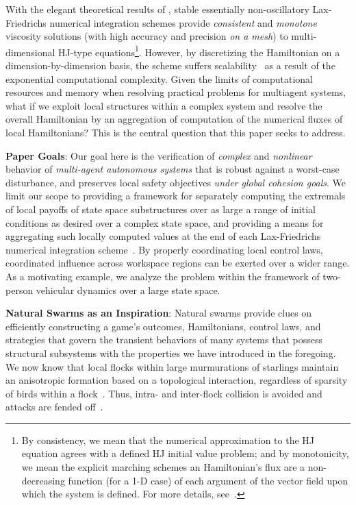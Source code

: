 With the elegant theoretical results of \cite{CrandallLaxFriedrichs, Crandall1984Approx, Evans1984, OsherShuENO, Crandall1984}, stable essentially non-oscillatory  Lax-Friedrichs numerical integration schemes provide  \textit{consistent} and \textit{monotone} viscosity solutions (with high accuracy and precision \textit{on a mesh}) to multi-dimensional HJ-type equations\footnote{By consistency, we mean that the numerical approximation to the HJ equation agrees with a defined HJ initial value problem; and by monotonicity, we mean the explicit marching schemes an Hamiltonian's flux are a non-decreasing function (for a 1-D case) of each argument of the vector field upon which the system is defined. For more details, see~\cite{Crandall1984Approx, OsherShuENO}.}. However, by discretizing the Hamiltonian on a dimension-by-dimension basis, the scheme suffers scalability~\cite{SylviaScalability, Bajcsy, Bansal} as a result of the exponential computational complexity. Given the limits of computational resources and memory when resolving practical problems for multiagent systems, what if we exploit local structures within a complex system and resolve the overall Hamiltonian by an aggregation of  computation of the numerical fluxes of local Hamiltonians? This is the central question that this paper seeks to address.


\textbf{Paper Goals}: Our goal here is the verification of  \textit{complex} and \textit{nonlinear} behavior of  \textit{multi-agent autonomous systems} that is robust against a worst-case disturbance, and preserves local safety objectives \textit{under global cohesion goals}. We limit our scope to providing a framework for separately computing the extremals of local payoffs of state space substructures over as large a range of initial conditions as desired over a complex state space,   and providing a means for aggregating such locally computed values at the end of each Lax-Friedrichs numerical integration scheme~\cite{Crandall1984Approx, OsherShuENO}. By properly coordinating local control laws, coordinated influence across workspace regions can be exerted over a wider range. 
As a motivating example, we analyze the problem within the framework of two-person vehicular dynamics over a large state space.  

\textbf{Natural Swarms as an Inspiration}: 
Natural swarms provide clues on efficiently constructing a game's outcomes, Hamiltonians, control laws, and strategies that govern the transient behaviors of many systems that possess structural subsystems with the properties we have introduced in the foregoing. We now know that local flocks within large murmurations of starlings maintain an anisotropic formation based on a topological interaction, regardless of sparsity of birds within a flock~\cite{Cavagna2010Scale}. Thus, intra- and inter-flock collision is avoided and attacks are fended off~\cite{Ballerini1232}.
 
